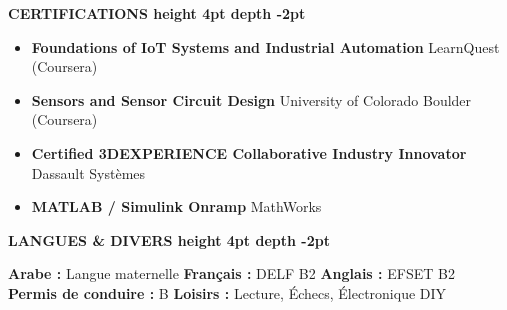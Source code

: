\documentclass[10pt,a4paper]{altacv}
\renewcommand{\cvsection}[2][]{%
  \medskip%
  {\color{heading}\LARGE\bfseries #2 \hspace{0.2em}\leaders\vrule height 4pt depth -2pt\hfill\mbox{}}\par\smallskip
}
\begin{document}
\cvsection{CERTIFICATIONS}
\begin{itemize}[leftmargin=*, label=\textbullet, itemsep=2pt]
  \item \textbf{Foundations of IoT Systems and Industrial Automation} \hfill {\color{emphasis}LearnQuest (Coursera)}
  \item \textbf{Sensors and Sensor Circuit Design} \hfill {\color{emphasis}University of Colorado Boulder (Coursera)}
  \item \textbf{Certified 3DEXPERIENCE Collaborative Industry Innovator} \hfill {\color{emphasis}Dassault Systèmes}
  \item \textbf{MATLAB / Simulink Onramp} \hfill {\color{emphasis}MathWorks}
\end{itemize}

\cvsection{LANGUES \& DIVERS}
\textbf{Arabe :} Langue maternelle \hfill \textbf{Français :} DELF B2 \hfill \textbf{Anglais :} EFSET B2\\[2pt]
\textbf{Permis de conduire :} B \hfill \textbf{Loisirs :} Lecture, Échecs, Électronique DIY
\end{document}
